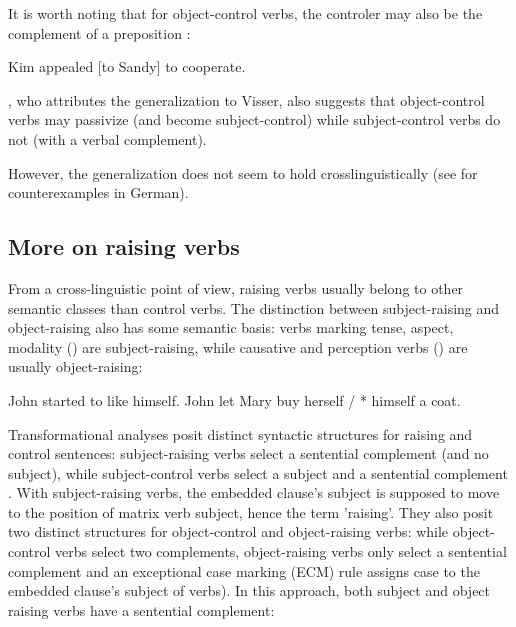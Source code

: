 \documentclass[output=paper
	        ,collection
	        ,collectionchapter
 	        ,biblatex
                ,babelshorthands
                ,newtxmath
                ,draftmode
                ,colorlinks, citecolor=brown
]{langscibook}
\begin{document}
It is worth noting that for object-control verbs, the controler may also be the complement of a preposition \citep[]{PollardandSag1994}:

\begin{exe}
\ex Kim appealed [to Sandy] to cooperate. \label{to}
\end{exe}


 
 \citet{Bresnan1982}, who attributes the generalization to Visser, also suggests that object-control verbs may passivize (and become subject-control) while subject-control verbs do not (with a verbal complement).
 
\eal
{}\label{persuade-pass}
\label{promise-pass}
\zl
However, the generalization does not seem to hold crosslinguistically (see  for counterexamples in German).
 
\subsection{More on raising verbs}

From a cross-linguistic point of view, raising verbs usually belong to other semantic classes than control verbs. The distinction between subject-raising and object-raising also has some semantic basis: verbs marking tense, aspect, modality () are subject-raising, while
causative and perception verbs () are usually object-raising:

	\begin{exe}
\ex  \begin{xlist}
\ex John started to like himself.
\ex John let Mary buy herself / * himself a coat.
	 \end{xlist}
	 \end{exe}
	

Transformational analyses posit distinct syntactic structures for raising and control sentences: subject-raising verbs select a sentential complement (and no subject), while subject-control verbs select a subject and a sentential complement \citep{Postal1974, Chomsky81a}. With subject-raising verbs, the embedded clause's subject is supposed to move to the position of matrix verb subject, hence the  term 'raising'. They also posit two distinct structures for object-control and object-raising verbs: while object-control verbs select two complements, object-raising verbs only select a sentential complement and
an exceptional case marking (ECM) rule assigns case to the embedded clause's subject of  verbs).
In this approach, both subject and object raising verbs have a sentential complement:
	
\end{document}
